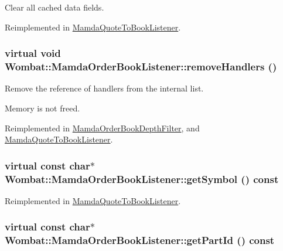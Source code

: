 Clear all cached data fields. 



Reimplemented in \hyperlink{classMamdaQuoteToBookListener_5d9ebf5190378ca7181473811c4d20c7}{Mamda\-Quote\-To\-Book\-Listener}.\hypertarget{classWombat_1_1MamdaOrderBookListener_ba3e661b148450a0865b07cf169a12b1}{
\subsubsection[removeHandlers]{\setlength{\rightskip}{0pt plus 5cm}virtual void Wombat::Mamda\-Order\-Book\-Listener::remove\-Handlers ()}}
\label{classWombat_1_1MamdaOrderBookListener_ba3e661b148450a0865b07cf169a12b1}


Remove the reference of handlers from the internal list. 

Memory is not freed. 

Reimplemented in \hyperlink{classMamdaOrderBookDepthFilter_699f621c1462b0787b6c1391bd48f32a}{Mamda\-Order\-Book\-Depth\-Filter}, and \hyperlink{classMamdaQuoteToBookListener_41f6149d1c5e0dd70d57998fcd81feb2}{Mamda\-Quote\-To\-Book\-Listener}.\hypertarget{classWombat_1_1MamdaOrderBookListener_11b3e826a2aba8faf699c16454051143}{
\subsubsection[getSymbol]{\setlength{\rightskip}{0pt plus 5cm}virtual const char$\ast$ Wombat::Mamda\-Order\-Book\-Listener::get\-Symbol () const}}
\label{classWombat_1_1MamdaOrderBookListener_11b3e826a2aba8faf699c16454051143}




Reimplemented in \hyperlink{classMamdaQuoteToBookListener_c93b05e297f0b56ee750c931c0c332da}{Mamda\-Quote\-To\-Book\-Listener}.\hypertarget{classWombat_1_1MamdaOrderBookListener_43689c10340beb6c62cc5b6e9680e44f}{
\subsubsection[getPartId]{\setlength{\rightskip}{0pt plus 5cm}virtual const char$\ast$ Wombat::Mamda\-Order\-Book\-Listener::get\-Part\-Id () const}}
\label{classWombat_1_1MamdaOrderBookListener_43689c10340beb6c62cc5b6e9680e44f}




